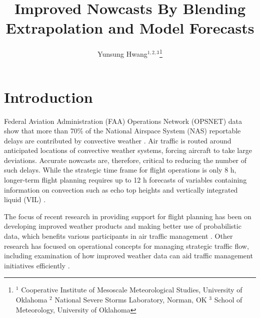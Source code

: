 \documentclass[12pt]{article}
\begin{document}
\title{Improved Nowcasts By Blending Extrapolation and Model Forecasts}

\author{Yunsung Hwang$^{1, 2, 3}$\thanks{$^1$ Cooperative Institute of Mesoscale Meteorological Studies, University of Oklahoma $^2$ National Severe Storms Laboratory, Norman, OK  $^3$ School of Meteorology, University of Oklahoma}}


\amstitle

\begin{abstract}

\end{abstract}

\section{Introduction}
Federal Aviation Administration (FAA) Operations Network (OPSNET) data show that more than 70\% of the National Airspace System (NAS) reportable delays are contributed by convective weather \citep{sheth++13}. Air traffic is routed around anticipated locations of convective weather systems, forcing aircraft to take large deviations. Accurate nowcasts are, therefore, critical to reducing the number of such delays. While the strategic time frame for flight operations is only 8 h, longer-term flight planning requires up to 12 h forecasts of variables containing information on convection such as echo top heights and vertically integrated liquid (VIL) \citep{robinson08, pinto++10}.

 The focus of recent research in providing support for flight planning has been on developing improved weather products and making better use of probabilistic data, which benefits various participants in air traffic management \citep{fahey++06}. Other research has focused on operational concepts for managing strategic traffic flow, including examination of how improved weather data can aid traffic management initiatives efficiently \citep{song++08}. 
 
\end{document}

